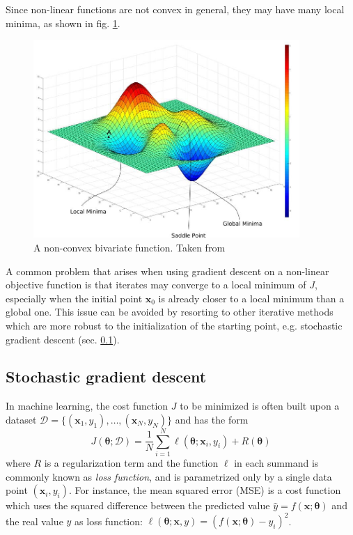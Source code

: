 Since non-linear functions are not convex in general, they may have many local minima, as shown in fig. \ref{fig:nonconvex_function}.
\begin{figure}[hbt!]
    \centering
    \includegraphics[width=0.9\textwidth]{images/nonconvex_function}
    \caption[A non-convex bivariate function]{A non-convex bivariate function. Taken from \cite{nonconvex_function_img}}
    \label{fig:nonconvex_function}
\end{figure}

A common problem that arises when using gradient descent on a non-linear objective function is that iterates may converge to a local minimum of $J$, especially when the initial point $\mathbf{x}_0$ is already closer to a local minimum than a global one. This issue can be avoided by resorting to other iterative methods which are more robust to the initialization of the starting point, e.g. stochastic gradient descent (sec. \ref{sec:sgd}).

\subsection{Stochastic gradient descent}
\label{sec:sgd}
In machine learning, the cost function $J$ to be minimized is often built upon a dataset $\mathcal{D} = \{(\mathbf{x}_1,y_1),\dots,(\mathbf{x}_N,y_N)\}$ and has the form
\begin{equation}
J(\bm{\theta};\mathcal{D}) = \frac{1}{N} \sum_{i=1}^N \ell(\bm{\theta};\mathbf{x}_i,y_i) + R(\bm{\theta})
\end{equation}
where $R$ is a regularization term and the function $\ell$ in each summand is commonly known as \textit{loss function}, and is parametrized only by a single data point $(\mathbf{x}_i,y_i)$. For instance, the mean squared error (MSE) is a cost function which uses the squared difference between the predicted value $\hat{y}=f(\mathbf{x};\bm{\theta})$ and the real value $y$ as loss function: $\ell(\bm{\theta}; \mathbf{x}, y) = (f(\mathbf{x};\bm{\theta}) - y_i)^2$.

